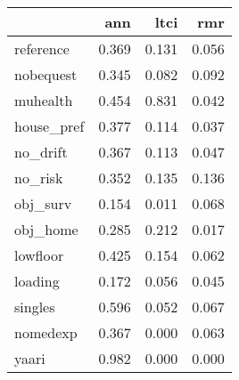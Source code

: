 \begin{tabular}{lrrr}
\toprule
{} &    ann &   ltci &    rmr \\
\midrule
reference  &  0.369 &  0.131 &  0.056 \\
nobequest  &  0.345 &  0.082 &  0.092 \\
muhealth   &  0.454 &  0.831 &  0.042 \\
house\_pref &  0.377 &  0.114 &  0.037 \\
no\_drift   &  0.367 &  0.113 &  0.047 \\
no\_risk    &  0.352 &  0.135 &  0.136 \\
obj\_surv   &  0.154 &  0.011 &  0.068 \\
obj\_home   &  0.285 &  0.212 &  0.017 \\
lowfloor   &  0.425 &  0.154 &  0.062 \\
loading    &  0.172 &  0.056 &  0.045 \\
singles    &  0.596 &  0.052 &  0.067 \\
nomedexp   &  0.367 &  0.000 &  0.063 \\
yaari      &  0.982 &  0.000 &  0.000 \\
\bottomrule
\end{tabular}
